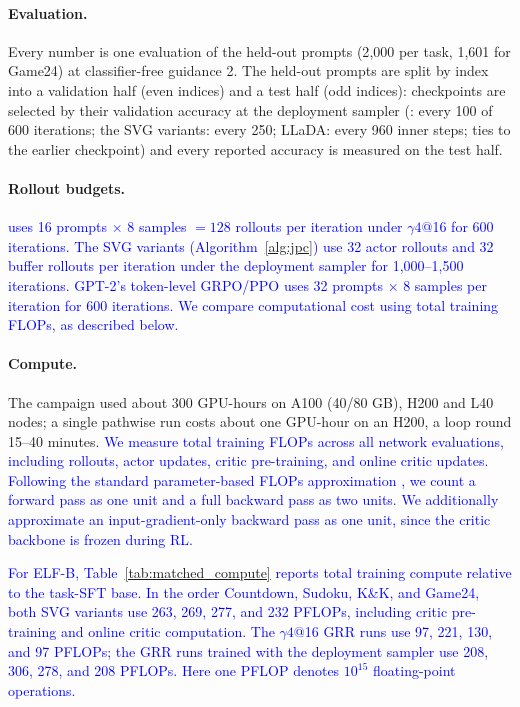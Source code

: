 \paragraph{Evaluation.}\label{app:seeds}
Every number is one evaluation of the held-out prompts (2{,}000 per task, 1{,}601 for Game24) at classifier-free guidance 2. The held-out prompts are split by index into a validation half (even indices) and a test half (odd indices): checkpoints are selected by their validation accuracy at the deployment sampler (\methodGRPO{}: every 100 of 600 iterations; the SVG variants: every 250; LLaDA: every 960 inner steps; ties to the earlier checkpoint) and every reported accuracy is measured on the test half.

\paragraph{Rollout budgets.}
\textcolor{blue}{\methodGRPO{} uses 16 prompts $\times$ 8 samples $=128$ rollouts per iteration under $\gamma4$@16 for 600 iterations. The SVG variants (Algorithm~\ref{alg:jpc}) use 32 actor rollouts and 32 buffer rollouts per iteration under the deployment sampler for 1{,}000--1{,}500 iterations. GPT-2's token-level GRPO/PPO uses 32 prompts $\times$ 8 samples per iteration for 600 iterations. We compare computational cost using total training FLOPs, as described below.}

\paragraph{Compute.}
The campaign used about 300 GPU-hours on A100 (40/80 GB), H200 and L40 nodes; a single pathwise run costs about one GPU-hour on an H200, a loop round 15--40 minutes. \textcolor{blue}{We measure total training FLOPs across all network evaluations, including rollouts, actor updates, critic pre-training, and online critic updates. Following the standard parameter-based FLOPs approximation \citep{hoffmann2022training}, we count a forward pass as one unit and a full backward pass as two units. We additionally approximate an input-gradient-only backward pass as one unit, since the critic backbone is frozen during RL.}

\textcolor{blue}{For ELF-B, Table~\ref{tab:matched_compute} reports total training compute relative to the task-SFT base. In the order Countdown, Sudoku, K\&K, and Game24, both SVG variants use 263, 269, 277, and 232 PFLOPs, including critic pre-training and online critic computation. The $\gamma4$@16 GRR runs use 97, 221, 130, and 97 PFLOPs; the GRR runs trained with the deployment sampler use 208, 306, 278, and 208 PFLOPs. Here one PFLOP denotes $10^{15}$ floating-point operations.}
